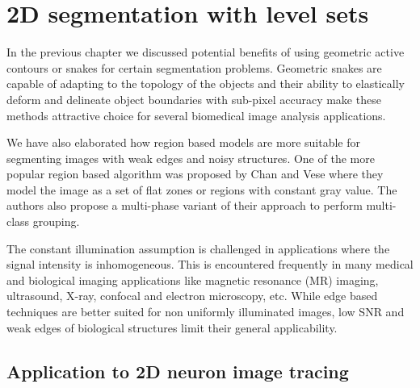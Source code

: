 \chapter{2D segmentation with level sets} %
\label{Chapter3} %


In the previous chapter we discussed potential benefits of using geometric active contours or snakes for certain segmentation problems. Geometric snakes are capable of adapting to the topology of the objects and  their ability to elastically deform and delineate object boundaries with sub-pixel accuracy make these methods attractive choice for several biomedical image analysis applications. 

We have also elaborated how region based models are more suitable for segmenting images with weak edges and noisy structures. One of the more popular region based algorithm was proposed by Chan and Vese\cite{chan_vese} where they model the image as a set of flat zones or regions with constant gray value. The authors also propose a multi-phase variant \cite{vese_multiphase} of their approach to perform multi-class grouping. 

The constant illumination assumption is challenged in applications where the signal intensity is inhomogeneous. This is encountered frequently in many medical and biological imaging applications like magnetic resonance (MR) imaging, ultrasound, X-ray, confocal and electron microscopy, etc. While edge based techniques are better suited for non uniformly illuminated images, low SNR and weak edges of biological structures limit their general applicability.

\section{Application to 2D neuron image tracing}

